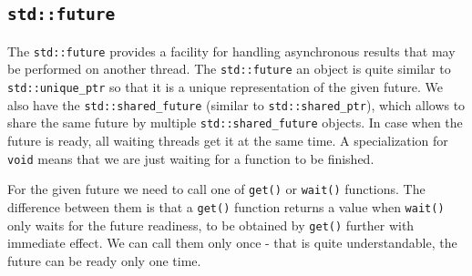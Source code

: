 \documentclass[../main]{subfiles}
\begin{document}
\subsection{\texttt{std::future}}
    The \texttt{std::future} provides a facility for handling
asynchronous results that may be performed on another thread. The \texttt{std::future} an object is quite similar to\linebreak
\texttt{std::unique\_ptr} so that it is a unique representation of the given future.
We also have the \texttt{std::shared\_future} (similar to \texttt{std::shared\_ptr}), which allows to share the same future by multiple \texttt{std::shared\_future} objects. In case when the future is ready, all
waiting threads get it at the same time. A specialization for \texttt{void} means that we are just waiting for a function to be finished.\newline

For the given future we need to call one of \texttt{get()} or \texttt{wait()} functions. The difference between them is that a \texttt{get()} function
returns a value when \texttt{wait()} only waits for the future readiness, to be obtained by \texttt{get()} further with immediate effect. We can call them
only once - that is quite understandable, the future can be ready only one time.\newline
\end{document}
